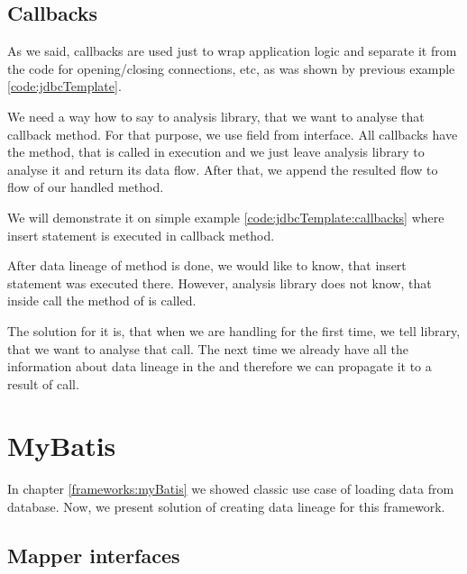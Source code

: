 \subsection{Callbacks}


As we said, callbacks are used just to wrap application logic and
separate it from the code for opening/closing connections, etc,
as was shown by previous example \ref{code:jdbcTemplate}.

We need a way how to say to analysis library, that we want to
analyse that callback method. For that purpose, we use
field  from interface. 
All callbacks have the method, that is called in execution
and we just leave analysis library to analyse it and return
its data flow. After that, we append the resulted flow
to flow of our handled method.

We will demonstrate it on simple example \ref{code:jdbcTemplate:callbacks}
where insert statement is executed in callback method.


After data lineage of  method is done,
we would like to know, that insert statement was executed there.
However, analysis library does not know, that inside
 call
the  method of  is called.

The solution for it is, that when we are handling
 for the first time, we tell library,
that we want to analyse that  call.
The next time we already have all the information
about data lineage in the 
and therefore we can propagate it to a result of
 call.




\section{MyBatis}

In chapter \ref{frameworks:myBatis} we showed classic use case of loading data from database.
Now, we present solution of creating data lineage for this framework.



\subsection{Mapper interfaces}

